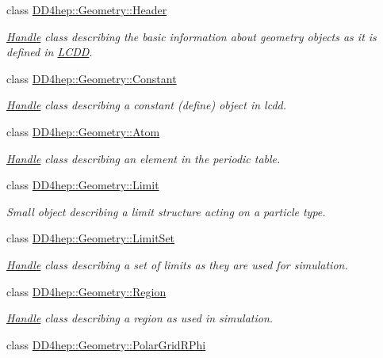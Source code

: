 \begin{DoxyCompactItemize}
class \hyperlink{class_d_d4hep_1_1_geometry_1_1_header}{D\+D4hep\+::\+Geometry\+::\+Header}
\begin{DoxyCompactList}\small\item\em \hyperlink{class_d_d4hep_1_1_handle}{Handle} class describing the basic information about geometry objects as it is defined in \hyperlink{class_d_d4hep_1_1_geometry_1_1_l_c_d_d}{L\+C\+DD}. \end{DoxyCompactList}\item 
class \hyperlink{class_d_d4hep_1_1_geometry_1_1_constant}{D\+D4hep\+::\+Geometry\+::\+Constant}
\begin{DoxyCompactList}\small\item\em \hyperlink{class_d_d4hep_1_1_handle}{Handle} class describing a constant (define) object in lcdd. \end{DoxyCompactList}\item 
class \hyperlink{class_d_d4hep_1_1_geometry_1_1_atom}{D\+D4hep\+::\+Geometry\+::\+Atom}
\begin{DoxyCompactList}\small\item\em \hyperlink{class_d_d4hep_1_1_handle}{Handle} class describing an element in the periodic table. \end{DoxyCompactList}\item 
class \hyperlink{class_d_d4hep_1_1_geometry_1_1_limit}{D\+D4hep\+::\+Geometry\+::\+Limit}
\begin{DoxyCompactList}\small\item\em Small object describing a limit structure acting on a particle type. \end{DoxyCompactList}\item 
class \hyperlink{class_d_d4hep_1_1_geometry_1_1_limit_set}{D\+D4hep\+::\+Geometry\+::\+Limit\+Set}
\begin{DoxyCompactList}\small\item\em \hyperlink{class_d_d4hep_1_1_handle}{Handle} class describing a set of limits as they are used for simulation. \end{DoxyCompactList}\item 
class \hyperlink{class_d_d4hep_1_1_geometry_1_1_region}{D\+D4hep\+::\+Geometry\+::\+Region}
\begin{DoxyCompactList}\small\item\em \hyperlink{class_d_d4hep_1_1_handle}{Handle} class describing a region as used in simulation. \end{DoxyCompactList}\item 
class \hyperlink{class_d_d4hep_1_1_geometry_1_1_polar_grid_r_phi}{D\+D4hep\+::\+Geometry\+::\+Polar\+Grid\+R\+Phi}

\end{DoxyCompactItemize}
